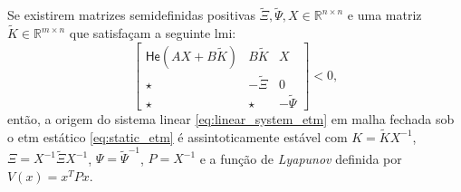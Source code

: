 \begin{theorem}
  \label{theorem:etm_stability}
  Se existirem matrizes semidefinidas positivas $\tilde{\Xi}, \tilde{\Psi}, X \in \mathbb{R}^{n \times n}$ e uma matriz $\tilde{K} \in \mathbb{R}^{m \times n}$ que satisfaçam a seguinte \acrshort{lmi}:
  \begin{equation}
    \begin{bmatrix}
      \mathsf{He}(AX +B\tilde{K}) & B\tilde{K}   & X             \\
      \star                       & -\tilde{\Xi} & 0             \\
      \star                       & \star        & -\tilde{\Psi}
    \end{bmatrix} < 0,
    \label{eq:etm_lmi_1}
  \end{equation}
  então, a origem do sistema linear \eqref{eq:linear_system_etm} em malha fechada sob o \acrshort{etm} estático \eqref{eq:static_etm} é assintoticamente estável com $K = \tilde{K}X^{-1}$, $\Xi= X^{-1}\tilde{\Xi}X^{-1}$, $\Psi = \tilde{\Psi}^{-1}$, $P = X^{-1}$ e a função de \textit{Lyapunov} definida por $V(x)=x^TPx$.
\end{theorem}

